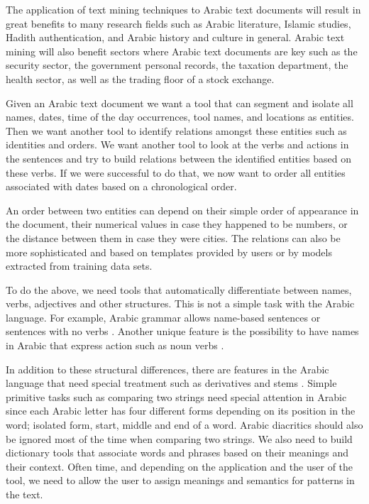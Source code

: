 \documentclass[12pt]{article}
\newcommand{\noTrNoVocRL}[1]{\novocalize\transfalse\RL{#1}\transtrue\vocalize}
\begin{document}
The application of text mining techniques to Arabic text documents 
will result in great benefits to many research fields such as 
Arabic literature,
Islamic studies, Hadith authentication, and Arabic history and 
culture in general.
Arabic text mining will also benefit sectors where Arabic text 
documents are key such as the security sector,
the government personal records,
the taxation department,
the health sector,
as well as the trading floor of a stock exchange.
 
Given an Arabic text document we want a tool that can segment 
and isolate all names, dates, time of the day occurrences,
tool names, and locations as entities.
Then we want another tool to identify relations amongst 
these entities such as identities and orders.
We want another tool to look at the verbs and actions in 
the sentences and try to build relations between the identified 
entities based on these verbs.
If we were successful to do that,
we now want to order all entities associated with dates based 
on a chronological order.

An order between two entities can depend on 
their simple order of appearance in the document, their 
numerical values in case they happened to be numbers, or
the distance between them in case they were cities. 
The relations can also be more sophisticated and 
based on templates provided by users or by 
models extracted from training data sets. 

To do the above, 
we need tools that automatically differentiate between 
names, verbs, adjectives and other structures.
This is not a simple task with the Arabic language.
For example, Arabic grammar allows name-based sentences 
or sentences with no verbs \noTrNoVocRL{^gml ismiyT} .
Another unique feature is the possibility to have names in Arabic 
that express action such as noun verbs 
\noTrNoVocRL{ism f`l, f-a`l $\ldots$}.

In addition to these structural differences,
there are features in the Arabic language that need special 
treatment such as derivatives and stems 
\noTrNoVocRL{alm^staq-at w al^g_dwr}.
Simple primitive tasks such as comparing two strings need 
special attention in Arabic since each Arabic letter has 
four different forms depending on its position in the word; 
isolated form, start, middle and end of a word.
Arabic diacritics should also be ignored most of the time 
when comparing two strings.
We also need to build dictionary tools that associate words 
and phrases based on their meanings and their context.
Often time,
and depending on the application and the user of the tool,
we need to allow the user to assign meanings and semantics 
for patterns in the text.
\end{document}
